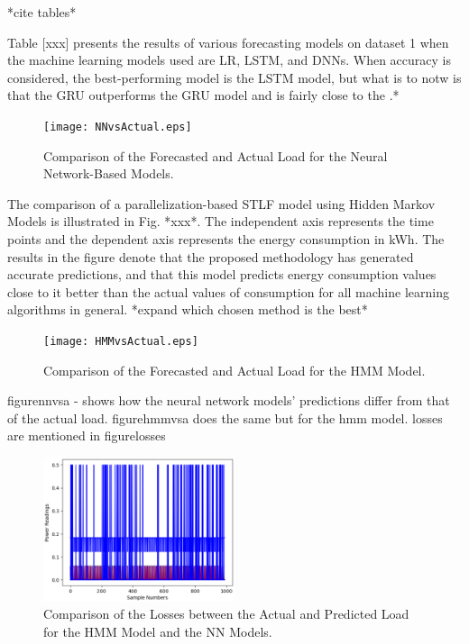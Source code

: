 \documentclass[conference]{IEEEtran}
\begin{document}
*cite tables*

Table [xxx] presents the results of various forecasting models on dataset 1 when the machine learning models used are LR, LSTM, and DNNs. When accuracy is considered, the best-performing model is the LSTM model, but what is to notw is that the GRU outperforms the GRU model and is fairly close to the .*

\begin{figure}[htbp]
  \centering
  \texttt{[image: NNvsActual.eps]}
  \caption{Comparison of the Forecasted and Actual Load for the Neural Network-Based Models.}
  \label{fig:nn_vs_a}
\end{figure}

The comparison of a parallelization-based STLF model using Hidden Markov Models is illustrated in Fig. *xxx*. The independent axis represents the time points and the dependent axis represents the energy consumption in kWh. The results in the figure denote that the proposed methodology has generated accurate predictions, and that this model predicts energy consumption values close to it better than the actual values of consumption for all machine learning algorithms in general. 
*expand which chosen method is the best*

\begin{figure}[htbp]
  \centering
  \texttt{[image: HMMvsActual.eps]}
  \caption{Comparison of the Forecasted and Actual Load for the HMM Model.}
  \label{fig:hmm_vs_a}
\end{figure}

figure{nnvsa} - shows how the neural network models' predictions differ from that of the actual load. figure{hmmvsa} does the same but for the hmm model. losses are mentioned in figure{losses} 

\begin{figure}[htbp]
  \centering
  \includegraphics[width=0.5\textwidth]{losses.eps}
  \caption{Comparison of the Losses between the Actual and Predicted Load for the HMM Model and the NN Models.}
  \label{fig:loss}
\end{figure}
\end{document}
